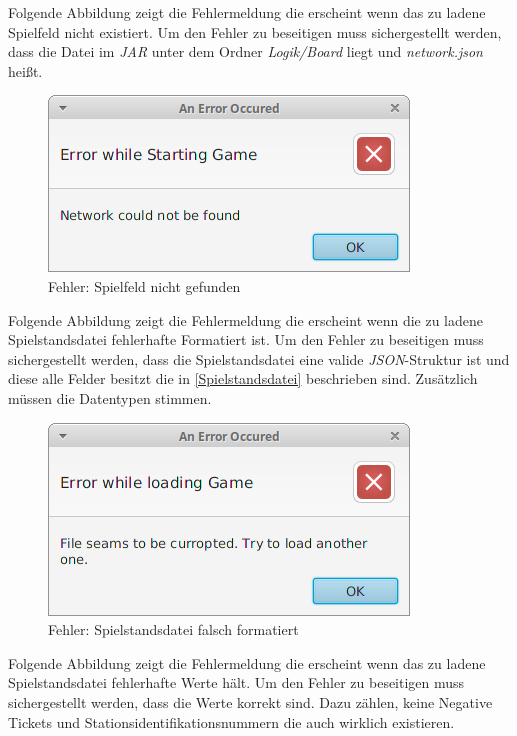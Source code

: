         Folgende Abbildung zeigt die Fehlermeldung die erscheint wenn das zu ladene Spielfeld nicht existiert.
        Um den Fehler zu beseitigen muss sichergestellt werden, dass die Datei im \textit{JAR} unter dem Ordner \textit{Logik/Board}
        liegt und \textit{network.json} heißt.
        \begin{figure}[H]
            \centering
            \includegraphics[scale=0.7]{img/benutzerhandbuch/error_nosuchfile.png}   
            \caption{Fehler: Spielfeld nicht gefunden}
        \end{figure}
        Folgende Abbildung zeigt die Fehlermeldung die erscheint wenn die zu ladene Spielstandsdatei fehlerhafte
        Formatiert ist. Um den Fehler zu beseitigen muss sichergestellt werden,
        dass die Spielstandsdatei eine valide \textit{JSON}-Struktur ist und diese alle Felder besitzt
        die in \ref{Spielstandsdatei} beschrieben sind. Zusätzlich müssen die Datentypen stimmen.
        \begin{figure}[H]
            \centering
            \includegraphics[scale=0.7]{img/benutzerhandbuch/error_savecorrupted.png}   
            \caption{Fehler: Spielstandsdatei falsch formatiert}
        \end{figure}
        Folgende Abbildung zeigt die Fehlermeldung die erscheint wenn das zu ladene Spielstandsdatei fehlerhafte
        Werte hält. Um den Fehler zu beseitigen muss sichergestellt werden, dass die Werte korrekt sind.
        Dazu zählen, keine Negative Tickets und Stationsidentifikationsnummern die auch wirklich existieren.
